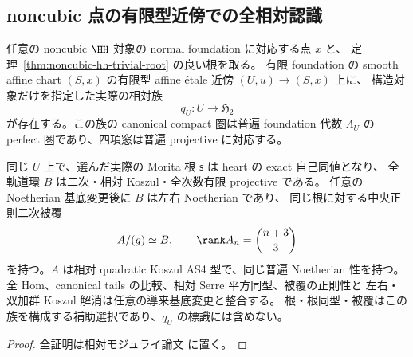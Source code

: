 \subsection{noncubic 点の有限型近傍での全相対認識}

\begin{theorem}
\label{thm:noncubic-finite-type-effectivity}
任意の noncubic $\HH$ 対象の normal foundation に対応する点 $x$ と、
定理~\ref{thm:noncubic-hh-trivial-root} の良い根を取る。
有限 foundation の smooth affine chart $(S,x)$ の有限型 affine
\texorpdfstring{\'etale}{etale} 近傍 $(U,u)\to(S,x)$ 上に、
構造対象だけを指定した実際の相対族
\[
 q_U:U\longrightarrow\mathfrak H_2
\]
が存在する。この族の canonical compact 圏は普遍 foundation 代数
$\Lambda_U$ の perfect 圏であり、四項窓は普遍 projective に対応する。

同じ $U$ 上で、選んだ実際の Morita 根 $\mathsf s$ は heart の exact 自己同値となり、
全軌道環 $B$ は二次・相対 Koszul・全次数有限 projective である。
任意の Noetherian 基底変更後に $B$ は左右 Noetherian であり、
同じ根に対する中央正則二次被覆
\[
 A/(g)\simeq B,
 \qquad \rank A_n=\binom{n+3}{3}
\]
を持つ。$A$ は相対 quadratic Koszul AS4 型で、同じ普遍 Noetherian 性を持つ。
全 Hom、canonical tails の比較、相対 Serre 平方同型、被覆の正則性と
左右・双加群 Koszul 解消は任意の導来基底変更と整合する。
根・根同型・被覆はこの族を構成する補助選択であり、$q_U$ の標識には含めない。
\end{theorem}

\begin{proof}
全証明は相対モジュライ論文 \cite[noncubic有限型効果性]{QuadricModuli2026} に置く。
\end{proof}
